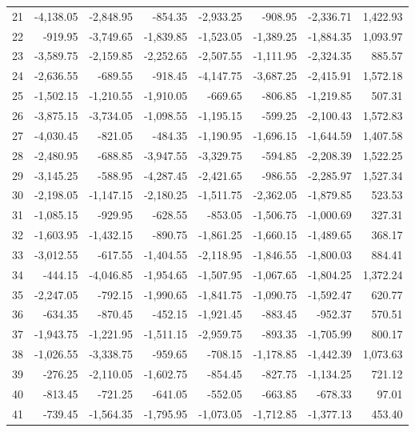 \begin{longtable}{rrrrrrrr}
21 & -4,138.05 & -2,848.95 & -854.35 & -2,933.25 & -908.95 & -2,336.71 & 1,422.93  \\
22 & -919.95 & -3,749.65 & -1,839.85 & -1,523.05 & -1,389.25 & -1,884.35 & 1,093.97  \\
23 & -3,589.75 & -2,159.85 & -2,252.65 & -2,507.55 & -1,111.95 & -2,324.35 & 885.57  \\
24 & -2,636.55 & -689.55 & -918.45 & -4,147.75 & -3,687.25 & -2,415.91 & 1,572.18  \\
25 & -1,502.15 & -1,210.55 & -1,910.05 & -669.65 & -806.85 & -1,219.85 & 507.31  \\
26 & -3,875.15 & -3,734.05 & -1,098.55 & -1,195.15 & -599.25 & -2,100.43 & 1,572.83  \\
27 & -4,030.45 & -821.05 & -484.35 & -1,190.95 & -1,696.15 & -1,644.59 & 1,407.58  \\
28 & -2,480.95 & -688.85 & -3,947.55 & -3,329.75 & -594.85 & -2,208.39 & 1,522.25  \\
29 & -3,145.25 & -588.95 & -4,287.45 & -2,421.65 & -986.55 & -2,285.97 & 1,527.34  \\
30 & -2,198.05 & -1,147.15 & -2,180.25 & -1,511.75 & -2,362.05 & -1,879.85 & 523.53  \\
31 & -1,085.15 & -929.95 & -628.55 & -853.05 & -1,506.75 & -1,000.69 & 327.31  \\
32 & -1,603.95 & -1,432.15 & -890.75 & -1,861.25 & -1,660.15 & -1,489.65 & 368.17  \\
33 & -3,012.55 & -617.55 & -1,404.55 & -2,118.95 & -1,846.55 & -1,800.03 & 884.41  \\
34 & -444.15 & -4,046.85 & -1,954.65 & -1,507.95 & -1,067.65 & -1,804.25 & 1,372.24  \\
35 & -2,247.05 & -792.15 & -1,990.65 & -1,841.75 & -1,090.75 & -1,592.47 & 620.77  \\
36 & -634.35 & -870.45 & -452.15 & -1,921.45 & -883.45 & -952.37 & 570.51  \\
37 & -1,943.75 & -1,221.95 & -1,511.15 & -2,959.75 & -893.35 & -1,705.99 & 800.17  \\
38 & -1,026.55 & -3,338.75 & -959.65 & -708.15 & -1,178.85 & -1,442.39 & 1,073.63  \\
39 & -276.25 & -2,110.05 & -1,602.75 & -854.45 & -827.75 & -1,134.25 & 721.12  \\
40 & -813.45 & -721.25 & -641.05 & -552.05 & -663.85 & -678.33 & 97.01  \\
41 & -739.45 & -1,564.35 & -1,795.95 & -1,073.05 & -1,712.85 & -1,377.13 & 453.40  \\

\end{longtable}
